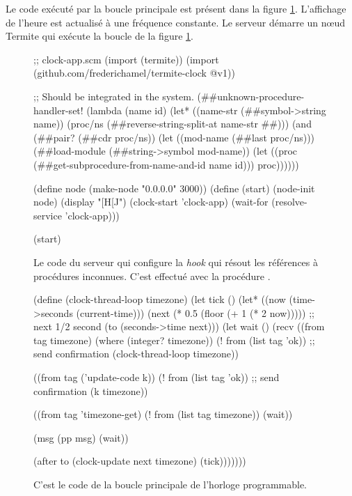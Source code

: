 Le code exécuté par la boucle principale est présent dans la figure
\ref{fig:termite-clock@v1}. L'affichage de l'heure est actualisé à
une fréquence constante. Le serveur démarre un nœud Termite qui
exécute la boucle de la figure \ref{fig:termite-clock@v1}.

\begin{figure}[h!]
\begin{center}
\begin{mplisting}{1}
;; clock-app.scm
(import (termite))
(import (github.com/frederichamel/termite-clock @v1))

;; Should be integrated in the system.
(##unknown-procedure-handler-set!
  (lambda (name id)
    (let* ((name-str (##symbol->string name))
           (proc/ns (##reverse-string-split-at name-str #\#)))
      (and (##pair? (##cdr proc/ns))
           (let ((mod-name (##last proc/ns)))
             (##load-module (##string->symbol mod-name))
             (let ((proc (##get-subprocedure-from-name-and-id name id)))
               proc))))))

(define node (make-node "0.0.0.0" 3000))
(define (start)
  (node-init node)
  (display "[H[J")
  (clock-start 'clock-app)
  (wait-for (resolve-service 'clock-app)))

(start)
\end{mplisting}
\end{center}
  \caption{Le code du serveur qui configure la \textit{hook}
    qui résout les références à procédures inconnues.
    C'est effectué avec la procédure .
    }
  \vspace*{4ex}
\end{figure}


\begin{figure}[h!]
  \centering
\begin{mplisting}{1}
(define (clock-thread-loop timezone)
  (let tick ()
    (let* ((now (time->seconds (current-time)))
           (next (* 0.5 (floor (+ 1 (* 2 now))))) ;; next 1/2 second
           (to (seconds->time next)))
      (let wait ()
        (recv
          ((from tag timezone) (where (integer? timezone))
           (! from (list tag 'ok)) ;; send confirmation
           (clock-thread-loop timezone))

          ((from tag ('update-code k))
           (! from (list tag 'ok)) ;; send confirmation
           (k timezone))

          ((from tag 'timezone-get)
           (! from (list tag timezone))
           (wait))

          (msg
           (pp msg)
           (wait))

          (after to
           (clock-update next timezone)
           (tick)))))))
\end{mplisting}
  \caption{C'est le code de la boucle principale de l'horloge programmable.}
  \label{fig:termite-clock@v1}
\end{figure}

